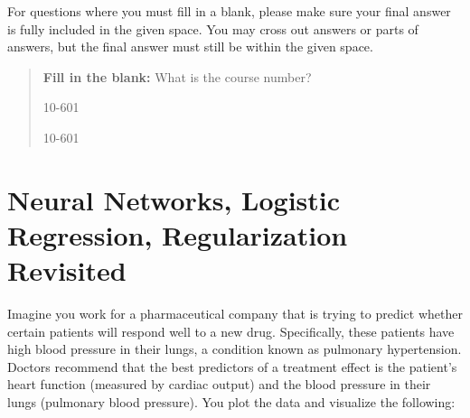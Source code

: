\documentclass[11pt,addpoints,answers]{exam}
\begin{document}
For questions where you must fill in a blank, please make sure your final answer is fully included in the given space. You may cross out answers or parts of answers, but the final answer must still be within the given space.

\begin{quote}
\textbf{Fill in the blank:} What is the course number?

\begin{tcolorbox}[fit,height=1cm, width=4cm, blank, borderline={1pt}{-2pt},nobeforeafter]
    \begin{center}\huge10-601\end{center}
    \end{tcolorbox}\hspace{2cm}
    \begin{tcolorbox}[fit,height=1cm, width=4cm, blank, borderline={1pt}{-2pt},nobeforeafter]
    \begin{center}\huge10-601\end{center}
    \end{tcolorbox}
\end{quote}

\clearpage
\clearpage
\newcommand \vcdim {\text{VC}(\mathcal{H})}

\section{Neural Networks, Logistic Regression, Regularization Revisited}
Imagine you work for a pharmaceutical company that is trying to predict whether certain patients will respond well to a new drug. Specifically, these patients have high blood pressure in their lungs, a condition known as pulmonary hypertension. Doctors recommend that the best predictors of a treatment effect is the patient's heart function (measured by cardiac output) and the blood pressure in their lungs (pulmonary blood pressure). You plot the data and visualize the following:
    
\end{document}

